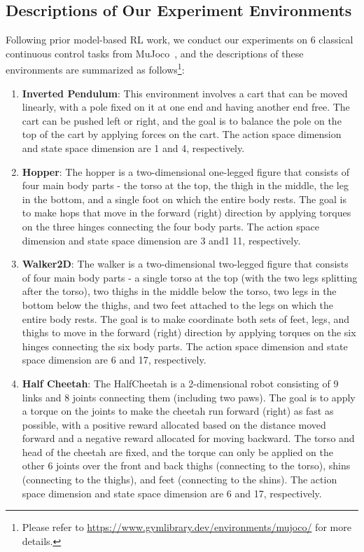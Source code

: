 \documentclass{article} %
\newcommand{\revision}[1]{{#1}}
\begin{document}
\subsection{\revision{Descriptions of Our Experiment Environments}}
\revision{Following prior model-based RL work, we conduct our experiments on 6 classical continuous control tasks from MuJoco~\citep{todorov2012mujoco}, and the descriptions of these environments are summarized as follows\footnote{Please refer to \url{https://www.gymlibrary.dev/environments/mujoco/} for more details.}: 
\begin{enumerate}
    \item {\bf Inverted Pendulum}: This environment involves a cart that can be moved linearly, with a pole fixed on it at one end and having another end free. The cart can be pushed left or right, and the goal is to balance the pole on the top of the cart by applying forces on the cart. The action space dimension and state space dimension are 1 and 4, respectively.
    \item {\bf Hopper}: The hopper is a two-dimensional one-legged figure that consists of four main body parts - the torso at the top, the thigh in the middle, the leg in the bottom, and a single foot on which the entire body rests. The goal is to make hops that move in the forward (right) direction by applying torques on the three hinges connecting the four body parts. The action space dimension and state space dimension are 3 and1 11, respectively.
    \item {\bf Walker2D}: The walker is a two-dimensional two-legged figure that consists of four main body parts - a single torso at the top (with the two legs splitting after the torso), two thighs in the middle below the torso, two legs in the bottom below the thighs, and two feet attached to the legs on which the entire body rests. The goal is to make coordinate both sets of feet, legs, and thighs to move in the forward (right) direction by applying torques on the six hinges connecting the six body parts. The action space dimension and state space dimension are 6 and 17, respectively.
    \item {\bf Half Cheetah}: The HalfCheetah is a 2-dimensional robot consisting of 9 links and 8 joints connecting them (including two paws). The goal is to apply a torque on the joints to make the cheetah run forward (right) as fast as possible, with a positive reward allocated based on the distance moved forward and a negative reward allocated for moving backward. The torso and head of the cheetah are fixed, and the torque can only be applied on the other 6 joints over the front and back thighs (connecting to the torso), shins (connecting to the thighs), and feet (connecting to the shins). The action space dimension and state space dimension are 6 and 17, respectively.

\end{enumerate}}
\end{document}
